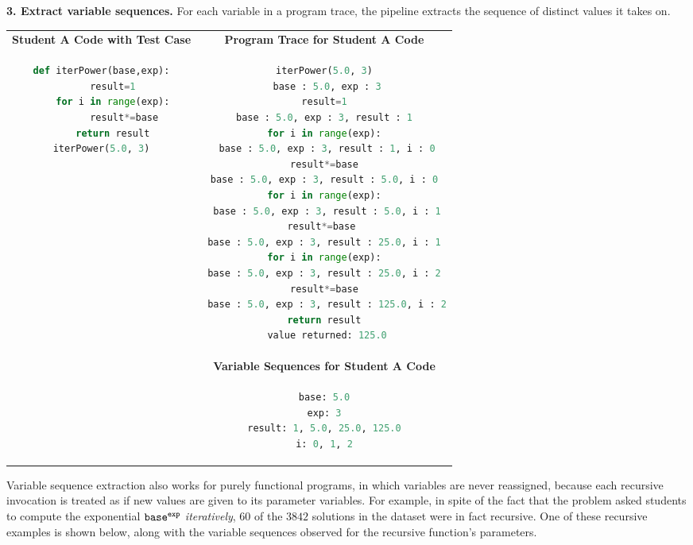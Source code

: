 {\bf 3. Extract variable sequences.} For each variable in a program trace, the pipeline extracts the sequence of distinct values it takes on.
\\
\begin{tabular}{cc}
{\bf Student A Code with Test Case} & {\bf Program Trace for Student A Code} \\
\begin{minipage}{0.35\linewidth}
\begin{lstlisting}[language=python]
def iterPower(base,exp):
    result=1
    for i in range(exp):
        result*=base
    return result
iterPower(5.0, 3)
\end{lstlisting}
\end{minipage} &
\begin{minipage}{0.6\linewidth}
\begin{lstlisting}[language=python,linebackgroundcolor={\lstcolorlines[lightyellow]{2,4,6,8,10,12,14,16,18}}]
iterPower(5.0, 3)
 base : 5.0, exp : 3
result=1
 base : 5.0, exp : 3, result : 1 
for i in range(exp):
 base : 5.0, exp : 3, result : 1, i : 0
result*=base
 base : 5.0, exp : 3, result : 5.0, i : 0 
for i in range(exp):
 base : 5.0, exp : 3, result : 5.0, i : 1
result*=base 
 base : 5.0, exp : 3, result : 25.0, i : 1 
for i in range(exp):
 base : 5.0, exp : 3, result : 25.0, i : 2 
result*=base
 base : 5.0, exp : 3, result : 125.0, i : 2
return result
 value returned: 125.0
\end{lstlisting}
\end{minipage} 
\\
& {\bf Variable Sequences for Student A Code} \\
&
\begin{minipage}{0.6\linewidth}
\begin{lstlisting}[language=python]
base: 5.0
exp: 3
result: 1, 5.0, 25.0, 125.0
i: 0, 1, 2
\end{lstlisting}
\end{minipage} \\
\end{tabular}

Variable sequence extraction also works for purely functional programs, in which variables are never reassigned, because each recursive invocation is treated as if new values are given to its parameter variables. For example, in spite of the fact that the  problem asked students to compute the exponential $\texttt{base}^{\texttt{exp}}$ \textit{iteratively}, $60$ of the $3842$  solutions in the dataset were in fact recursive. One of these recursive examples is shown below, along with the variable sequences observed for the recursive function's parameters.

